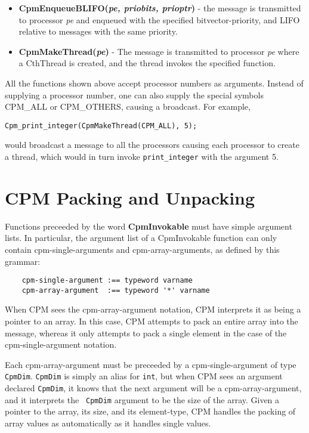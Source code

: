 \begin{itemize}
\item[]{{\bf CpmEnqueueBLIFO({\it pe, priobits, prioptr})} - the
message is transmitted to processor {\it pe} and enqueued with the
specified bitvector-priority, and LIFO relative to messages with the
same priority.}

\item[]{{\bf CpmMakeThread({\it pe})} - The message is transmitted to
processor {\it pe} where a CthThread is created, and the thread
invokes the specified function.}

\end{itemize}

All the functions shown above accept processor numbers as arguments.
Instead of supplying a processor number, one can also supply the
special symbols CPM\_ALL or CPM\_OTHERS, causing a broadcast.  For
example,

\begin{verbatim}
Cpm_print_integer(CpmMakeThread(CPM_ALL), 5);
\end{verbatim}

would broadcast a message to all the processors causing each processor
to create a thread, which would in turn invoke {\tt print\_integer}
with the argument 5.

\section{CPM Packing and Unpacking}

Functions preceeded by the word {\bf CpmInvokable} must have simple
argument lists.  In particular, the argument list of a CpmInvokable
function can only contain cpm-single-arguments and cpm-array-arguments,
as defined by this grammar:

\begin{verbatim}
    cpm-single-argument :== typeword varname
    cpm-array-argument  :== typeword '*' varname
\end{verbatim}

When CPM sees the cpm-array-argument notation, CPM interprets it as
being a pointer to an array.  In this case, CPM attempts to pack an
entire array into the message, whereas it only attempts to pack a
single element in the case of the cpm-single-argument notation.

Each cpm-array-argument must be preceeded by a cpm-single-argument of
type {\tt CpmDim}.  {\tt CpmDim} is simply an alias for {\tt int}, but
when CPM sees an argument declared {\tt CpmDim}, it knows that the
next argument will be a cpm-array-argument, and it interprets the {\tt
CpmDim} argument to be the size of the array.  Given a pointer to the
array, its size, and its element-type, CPM handles the packing of
array values as automatically as it handles single values.

